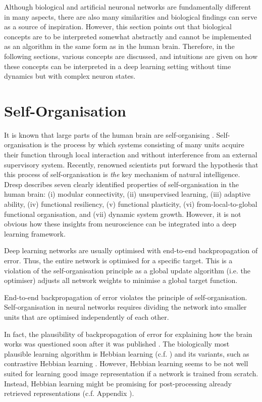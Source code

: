 Although biological and artificial neuronal networks are fundamentally different in many aspects, there are also many similarities and biological findings can serve as a source of inspiration. However, this section points out that biological concepts are to be interpreted somewhat abstractly and cannot be implemented as an algorithm in the same form as in the human brain. Therefore, in the following sections, various concepts are discussed, and intuitions are given on how these concepts can be interpreted in a deep learning setting without time dynamics but with complex neuron states.

\section{Self-Organisation}
It is known that large parts of the human brain are self-organising .
Self-organisation is the process by which systems consisting of many units acquire their function through local interaction and without interference from an external supervisory system.
Recently, renowned scientists  put forward the hypothesis that this process of self-organisation is \emph{the} key mechanism of natural intelligence.
Dresp  describes seven clearly identified properties of self-organisation in the human brain: (i) modular connectivity, (ii) unsupervised learning, (iii) adaptive ability, (iv) functional resiliency, (v) functional plasticity, (vi) from-local-to-global functional organisation, and (vii) dynamic system growth.
However, it is not obvious how these insights from neuroscience can be integrated into a deep learning framework.

Deep learning networks are usually optimised with end-to-end backpropagation of error.
Thus, the entire network is optimised for a specific target.
This is a violation of the self-organisation principle as a global update algorithm (i.e. the optimiser) adjusts all network weights to minimise a global target function.


\begin{claim}
	End-to-end backpropagation of error violates the principle of self-organisation. Self-organisation in neural networks requires dividing the network into smaller units that are optimised independently of each other.
\end{claim}

In fact, the plausibility of backpropagation of error for explaining how the brain works was questioned soon after it was published .
The biologically most plausible learning algorithm is Hebbian learning (c.f. ) and its variants, such as contrastive Hebbian learning .
However, Hebbian learning seems to be not well suited for learning good image representation if a network is trained from scratch. Instead, Hebbian learning might be promising for post-processing already retrieved representations (c.f. Appendix ).

